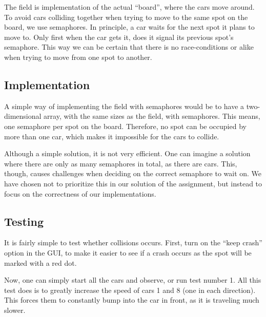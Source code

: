 
The field is implementation of the actual ``board'', where the cars
move around. To avoid cars colliding together when trying to move to
the same spot on the board, we use semaphores. In principle, a car
waits for the next spot it plans to move to. Only first when the car
gets it, does it signal its previous spot's semaphore. This way we can
be certain that there is no race-conditions or alike when trying to
move from one spot to another.


\subsection{Implementation}
\label{sub:field-impl}
A simple way of implementing the field with semaphores would be to
have a two-dimensional array, with the same sizes as the field, with
semaphores. This means, one semaphore per spot on the
board. Therefore, no spot can be occupied by more than one car, which
makes it impossible for the cars to collide.

Although a simple solution, it is not very efficient. One can imagine
a solution where there are only as many semaphores in total, as there
are cars. This, though, causes challenges when deciding on the correct
semaphore to wait on. We have chosen not to prioritize this in our
solution of the assignment, but instead to focus on the correctness of
our implementations.


\subsection{Testing}
\label{sub:field-test}
It is fairly simple to test whether collisions occurs. First, turn on
the ``keep crash'' option in the GUI, to make it easier to see if a
crash occurs as the spot will be marked with a red dot.

Now, one can simply start all the cars and observe, or run test number
1. All this test does is to greatly increase the speed of cars 1 and 8
(one in each direction). This forces them to constantly bump into the
car in front, as it is traveling much slower.
